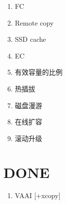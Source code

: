 \begin{tcolorbox}
\begin{enumerate}
    \item FC
    \item Remote copy
    \item SSD cache
    \item EC
    \item 有效容量的比例
    \item 热插拔
    \item 磁盘漫游
    \item 在线扩容
    \item 滚动升级
\end{enumerate}
\end{tcolorbox}

\section{DONE}

\begin{enumerate}
    \item VAAI [+xcopy]
\end{enumerate}
